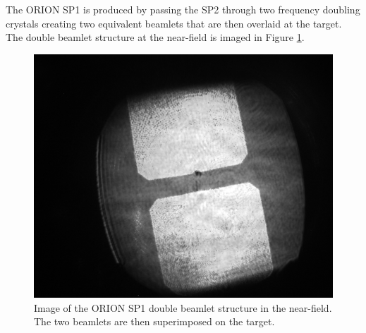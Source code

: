 The ORION SP1 is produced by passing the SP2 through two frequency doubling crystals creating two equivalent beamlets that are then overlaid at the target. The double beamlet structure at the near-field is imaged in Figure \ref{fig:oriondoublebeamletsnearfield}.
\begin{figure}
	\centering
	\includegraphics[width=0.5\linewidth]{figures/orion/orion_doublebeamlets_near_field}
	\caption[Image of the ORION SP1 double beamlet structure in the near-field.]{Image of the ORION SP1 double beamlet structure in the near-field. The two beamlets are then superimposed on the target.}
	\label{fig:oriondoublebeamletsnearfield}
\end{figure}

